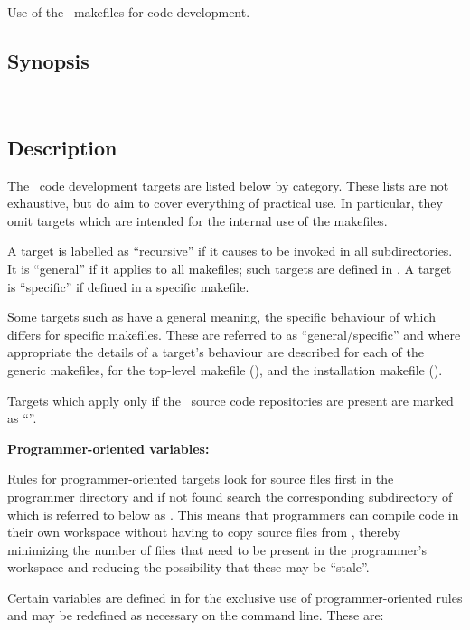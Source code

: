 Use of the \aipspp\ makefiles for code development. 

\subsection*{Synopsis}

\begin{synopsis}
   \\
\end{synopsis}

\subsection*{Description}

The \aipspp\ code development targets are listed below by category.  These
lists are not exhaustive, but do aim to cover everything of practical use.  In
particular, they omit targets which are intended for the internal use of the
makefiles.

A target is labelled as ``recursive'' if it causes  to be
invoked in all subdirectories.  It is ``general'' if it applies to all
makefiles; such targets are defined in .  A target is
``specific'' if defined in a specific makefile.

Some targets such as  have a general meaning, the specific
behaviour of which differs for specific makefiles.  These are referred to as
``general/specific'' and where appropriate the details of a target's behaviour
are described for each of the generic makefiles, for the top-level makefile
(), and the installation makefile ().

Targets which apply only if the \rcs\ source code repositories are present
are marked as ``\rcs''.

\textbf{Programmer-oriented variables:}

Rules for programmer-oriented targets look for source files first in the
programmer directory and if not found search the corresponding subdirectory of
 which is referred to below as .  This means
that programmers can compile code in their own workspace without having to
copy source files from , thereby minimizing the number of
files that need to be present in the programmer's workspace and reducing the
possibility that these may be ``stale''.

Certain variables are defined in  for the exclusive use of
programmer-oriented rules and may be redefined as necessary on the
 command line.  These are:

